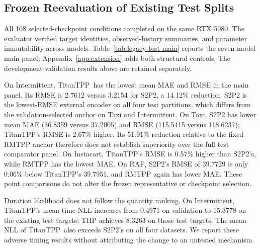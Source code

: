 \documentclass[runningheads]{llncs}
\newcommand{\method}{TitanTPP}
\begin{document}
\subsection{Frozen Reevaluation of Existing Test Splits}\label{sec:legacy-test}
All 108 selected-checkpoint conditions completed on the same RTX 5080.
The evaluator verified target identities, observed-history summaries, and
parameter immutability across models. Table~\ref{tab:legacy-test-main} reports the
seven-model main panel; Appendix~\ref{app:extension} adds both structural
controls. The development-validation results above are retained separately.

On Intermittent, \method\ has the lowest mean MAE and RMSE in the main
panel. Its RMSE is 2.7612 versus 3.2154 for S2P2, a 14.12\% reduction.
S2P2 is the lowest-RMSE external encoder on all four test partitions, which
differs from the validation-selected anchor on Taxi and Intermittent.
On Taxi, S2P2 has lower mean MAE (36.8359 versus 37.2005) and RMSE
(115.5415 versus 118.6237); \method's RMSE is 2.67\% higher.
Its 51.91\% reduction relative to the fixed RMTPP anchor therefore does
not establish superiority over the full test comparator panel.
On Instacart, \method's RMSE is 0.57\% higher than S2P2's, while RMTPP
has the lowest MAE. On RAF, S2P2's RMSE of 39.7729 is only 0.06\% below
\method's 39.7951, and RMTPP again has lower MAE. These point comparisons
do not alter the frozen representative or checkpoint selection.

Duration likelihood does not follow the quantity ranking. On Intermittent,
\method's mean time NLL increases from 0.4971 on validation to 15.3778
on the existing test targets; THP achieves 8.3263 on those test targets.
The mean NLL of \method\ also exceeds S2P2's on all four datasets.
We report these adverse timing results without attributing the change to
an untested mechanism.
\end{document}
